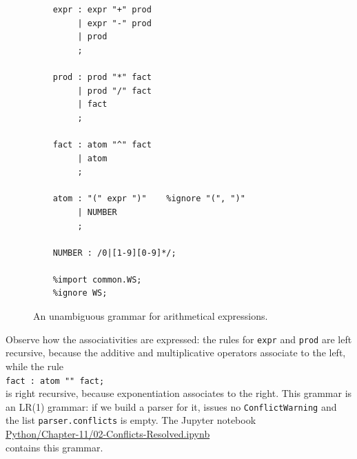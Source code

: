 \begin{figure}[!ht]
\centering
\begin{verbatim}
    expr : expr "+" prod
         | expr "-" prod
         | prod
         ;

    prod : prod "*" fact
         | prod "/" fact
         | fact
         ;

    fact : atom "^" fact
         | atom
         ;

    atom : "(" expr ")"    %ignore "(", ")"
         | NUMBER
         ;

    NUMBER : /0|[1-9][0-9]*/;

    %import common.WS;
    %ignore WS;
\end{verbatim}
\vspace*{-0.3cm}
\caption{An unambiguous  grammar for arithmetical expressions.}
\label{fig:grammar-layered}
\end{figure}
\FloatBarrier

\noindent
Observe how the associativities are expressed: the rules for \texttt{expr} and \texttt{prod} are left recursive,
because the additive and multiplicative operators associate to the left, while the rule
\\[0.2cm]
\hspace*{1.3cm}
\texttt{fact : atom "" fact;}
\\[0.2cm]
is right recursive, because exponentiation associates to the right.  This grammar is an LR(1)
grammar: if we build a parser for it,  issues no \texttt{ConflictWarning} and the list
\texttt{parser.conflicts} is empty.  The Jupyter notebook
\\[0.2cm]
\hspace*{1.3cm}
\href{https://github.com/karlstroetmann/Formal-Languages/blob/master/Python/Chapter-11/02-Conflicts-Resolved.ipynb}{Python/Chapter-11/02-Conflicts-Resolved.ipynb}
\\[0.2cm]
contains this grammar.

